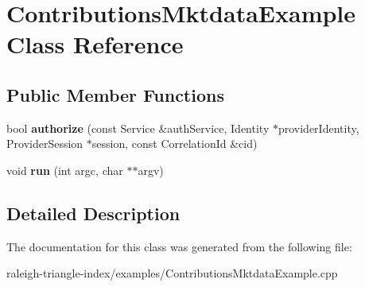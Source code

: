 \section{Contributions\+Mktdata\+Example Class Reference}
\label{class_contributions_mktdata_example}
\subsection*{Public Member Functions}
\begin{DoxyCompactItemize}
\item 
bool {\bfseries authorize} (const Service \&auth\+Service, Identity $\ast$provider\+Identity, Provider\+Session $\ast$session, const Correlation\+Id \&cid)\label{class_contributions_mktdata_example_a65a88ec3eefd1a5e872764c3c48c5bd4}

\item 
void {\bfseries run} (int argc, char $\ast$$\ast$argv)\label{class_contributions_mktdata_example_a29a49618b7a011afeb674c978011240b}

\end{DoxyCompactItemize}


\subsection{Detailed Description}


The documentation for this class was generated from the following file\+:\begin{DoxyCompactItemize}
\item 
raleigh-\/triangle-\/index/examples/Contributions\+Mktdata\+Example.\+cpp\end{DoxyCompactItemize}
